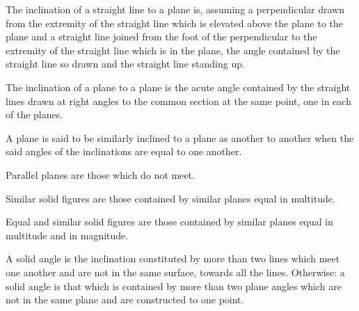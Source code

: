 \documentclass{rrxiv}
\begin{document}
\begin{scope}
\label{def:XI.5}
The inclination of a straight line to a plane is, assuming a
perpendicular drawn from the extremity of the straight line which is
elevated above the plane to the plane and a straight line joined from
the foot of the perpendicular to the extremity of the straight line
which is in the plane, the angle contained by the straight line so
drawn and the straight line standing up.
\end{scope}

\begin{scope}
\label{def:XI.6}
The inclination of a plane to a plane is the acute angle contained
by the straight lines drawn at right angles to the common section at
the same point, one in each of the planes.
\end{scope}

\begin{scope}
\label{def:XI.7}
A plane is said to be similarly inclined to a plane as another to
another when the said angles of the inclinations are equal to one
another.
\end{scope}

\begin{scope}
\label{def:XI.8}
Parallel planes are those which do not meet.
\end{scope}

\begin{scope}
\label{def:XI.9}
Similar solid figures are those contained by similar planes equal in
multitude.
\end{scope}

\begin{scope}
\label{def:XI.10}
Equal and similar solid figures are those contained by similar planes
equal in multitude and in magnitude.
\end{scope}

\begin{scope}
\label{def:XI.11}
A solid angle is the inclination constituted by more than two lines
which meet one another and are not in the same surface, towards all
the lines.  Otherwise: a solid angle is that which is contained by
more than two plane angles which are not in the same plane and are
constructed to one point.
\end{scope}
\end{document}

